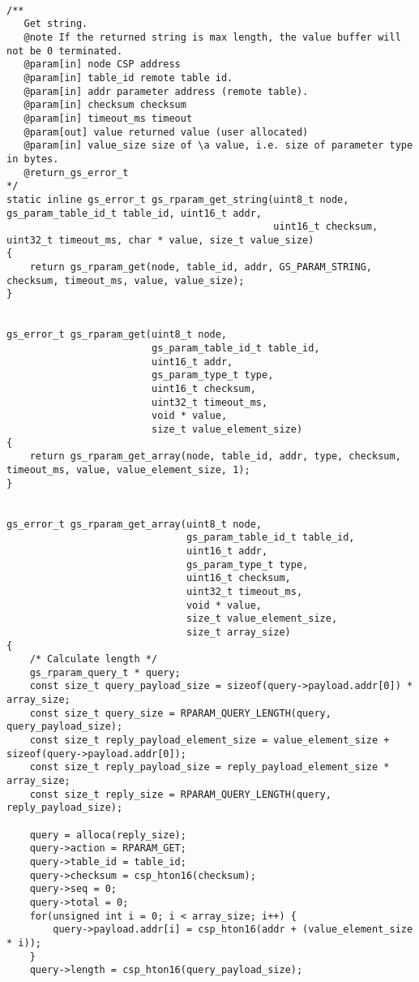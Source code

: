\begin{lstlisting}[style=CStyle, caption=Example of extended data-driven mutation probe for libParam, label=GSLcover]

/**
   Get string.
   @note If the returned string is max length, the value buffer will not be 0 terminated.
   @param[in] node CSP address
   @param[in] table_id remote table id.
   @param[in] addr parameter address (remote table).
   @param[in] checksum checksum
   @param[in] timeout_ms timeout
   @param[out] value returned value (user allocated)
   @param[in] value_size size of \a value, i.e. size of parameter type in bytes.
   @return_gs_error_t
*/
static inline gs_error_t gs_rparam_get_string(uint8_t node, gs_param_table_id_t table_id, uint16_t addr,
                                              uint16_t checksum, uint32_t timeout_ms, char * value, size_t value_size)
{
    return gs_rparam_get(node, table_id, addr, GS_PARAM_STRING, checksum, timeout_ms, value, value_size);
}


gs_error_t gs_rparam_get(uint8_t node,
                         gs_param_table_id_t table_id,
                         uint16_t addr,
                         gs_param_type_t type,
                         uint16_t checksum,
                         uint32_t timeout_ms,
                         void * value,
                         size_t value_element_size)
{
    return gs_rparam_get_array(node, table_id, addr, type, checksum, timeout_ms, value, value_element_size, 1);
}


gs_error_t gs_rparam_get_array(uint8_t node,
                               gs_param_table_id_t table_id,
                               uint16_t addr,
                               gs_param_type_t type,
                               uint16_t checksum,
                               uint32_t timeout_ms,
                               void * value,
                               size_t value_element_size,
                               size_t array_size)
{
    /* Calculate length */
    gs_rparam_query_t * query;
    const size_t query_payload_size = sizeof(query->payload.addr[0]) * array_size;
    const size_t query_size = RPARAM_QUERY_LENGTH(query, query_payload_size);
    const size_t reply_payload_element_size = value_element_size + sizeof(query->payload.addr[0]);
    const size_t reply_payload_size = reply_payload_element_size * array_size;
    const size_t reply_size = RPARAM_QUERY_LENGTH(query, reply_payload_size);

    query = alloca(reply_size);
    query->action = RPARAM_GET;
    query->table_id = table_id;
    query->checksum = csp_hton16(checksum);
    query->seq = 0;
    query->total = 0;
    for(unsigned int i = 0; i < array_size; i++) {
        query->payload.addr[i] = csp_hton16(addr + (value_element_size * i));
    }
    query->length = csp_hton16(query_payload_size);


\end{lstlisting}
